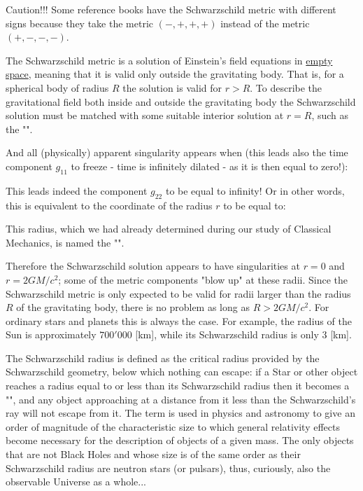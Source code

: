 	\begin{tcolorbox}[colback=red!5,borderline={1mm}{2mm}{red!5},arc=0mm,boxrule=0pt]
	\bcbombe Caution!!! Some reference books have the Schwarzschild metric with different signs because they take the metric $(-, +, +, +)$ instead of the metric $(+, -, -, -)$.
	\end{tcolorbox}
	
	The Schwarzschild metric is a solution of Einstein's field equations in \underline{empty space}, meaning that it is valid only outside the gravitating body. That is, for a spherical body of radius $R$ the solution is valid for $r > R$. To describe the gravitational field both inside and outside the gravitating body the Schwarzschild solution must be matched with some suitable interior solution at $r = R$, such as the "".

	And all (physically) apparent singularity appears when (this leads also the time component $g_{11}$ to freeze - time is infinitely dilated - as it is then equal to zero!):
	
	This leads indeed the component $g_{22}$ to be equal to infinity! Or in other words, this is equivalent to the coordinate of the radius $r$ to be equal to:
	
	This radius, which we had already determined during our study of Classical Mechanics, is named the "\label{schwarzschild radius}".

	Therefore the Schwarzschild solution appears to have singularities at $r = 0$ and $r = 2GM/c^2$; some of the metric components "blow up" at these radii. Since the Schwarzschild metric is only expected to be valid for radii larger than the radius $R$ of the gravitating body, there is no problem as long as $R > 2GM/c^2$. For ordinary stars and planets this is always the case. For example, the radius of the Sun is approximately $700'000$ [km], while its Schwarzschild radius is only $3$ [km].
	
	The Schwarzschild radius is defined as the critical radius provided by the Schwarzschild geometry, below which nothing can escape: if a Star or other object reaches a radius equal to or less than its Schwarzschild radius then it becomes a "", and any object approaching at a distance from it less than the Schwarzschild's ray will not escape from it. The term is used in physics and astronomy to give an order of magnitude of the characteristic size to which general relativity effects become necessary for the description of objects of a given mass. The only objects that are not Black Holes and whose size is of the same order as their Schwarzschild radius are neutron stars (or pulsars), thus, curiously, also the observable Universe as a whole...
	
